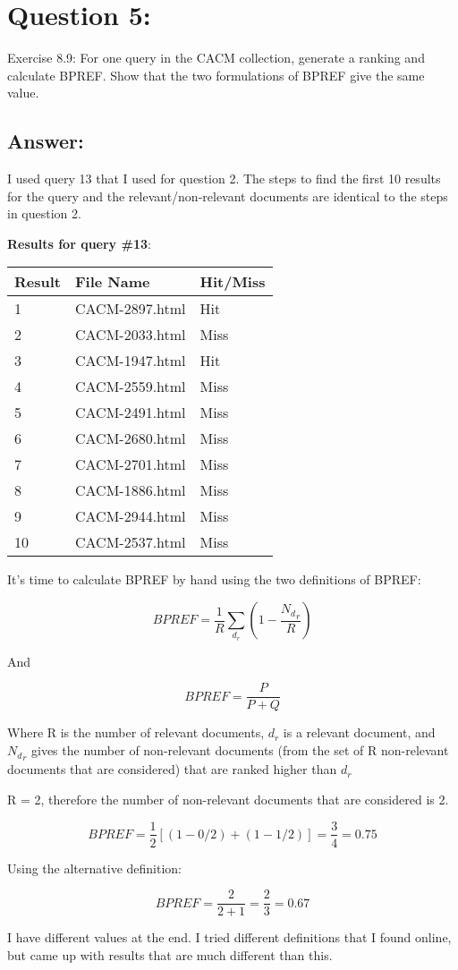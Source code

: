 \section*{Question 5:}
Exercise 8.9:
For one query in the CACM collection, generate a ranking and calculate BPREF. Show that the two formulations of BPREF give the same value.
\subsection*{Answer:}

I used query 13 that I used for question 2. The steps to find the first 10 results for the query and the relevant/non-relevant documents are identical to the steps in question 2.

\textbf{Results for query \#13}:

\begin{longtable}{ |p{1cm}|p{4cm}|p{3cm}| } 
\hline
Result & File Name & Hit/Miss \\
\hline
1 & CACM-2897.html & Hit \\
\hline
2 & CACM-2033.html & Miss \\
\hline
3 & CACM-1947.html & Hit \\
\hline
4 & CACM-2559.html & Miss \\
\hline
5 & CACM-2491.html & Miss \\
\hline
6 & CACM-2680.html & Miss \\
\hline
7 & CACM-2701.html & Miss \\
\hline
8 & CACM-1886.html & Miss \\
\hline
9 & CACM-2944.html & Miss  \\
\hline
10 & CACM-2537.html & Miss \\
\hline
\end{longtable}

It's time to calculate BPREF by hand using the two definitions of BPREF:

$$ BPREF = \frac{1}{R} \sum_{d_r} (1-\frac{{N_d}_r}{R}) $$

And

$$ BPREF = \frac{P}{P+Q} $$

Where R is the number of relevant documents, $d_r$ is a relevant document, and ${N_d}_r$ gives the number of non-relevant documents (from the set of R non-relevant documents that are considered) that are ranked higher than $d_r$ 

R = 2, therefore the number of non-relevant documents that are considered is 2. 

$$ BPREF = \frac{1}{2} [(1-0/2) + (1-1/2)] = \frac{3}{4} = 0.75 $$

Using the alternative definition:

$$ BPREF = \frac{2}{2+1} = \frac{2}{3} = 0.67 $$

I have different values at the end. I tried different definitions that I found online, but came up with results that are much different than this.